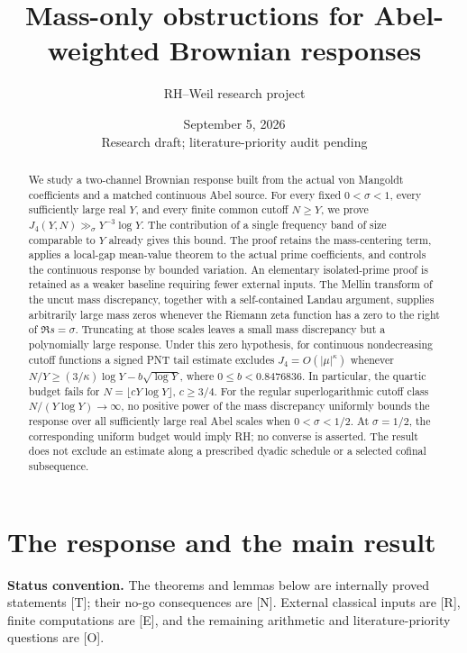 \documentclass[11pt,a4paper]{article}
\title{Mass-only obstructions for Abel-weighted Brownian responses}
\author{RH--Weil research project}
\date{September 5, 2026\\[3pt]\small Research draft; literature-priority audit pending}
\theoremstyle{definition}
\theoremstyle{remark}
\begin{document}
\maketitle
\begin{abstract}
We study a two-channel Brownian response built from the actual
von Mangoldt coefficients and a matched continuous Abel source.
For every fixed \(0<\sigma<1\), every sufficiently large real \(Y\),
and every finite common cutoff \(N\ge Y\), we prove
\(J_4(Y,N)\gg_\sigma Y^{-3}\log Y\).
The contribution of a single frequency band of size comparable to
\(Y\) already gives this bound. The proof retains the mass-centering
term, applies a local-gap mean-value theorem to the actual prime
coefficients, and controls the continuous response by bounded variation.
An elementary isolated-prime proof is retained as a weaker baseline
requiring fewer external inputs.
The Mellin transform of the uncut mass discrepancy, together with
a self-contained Landau argument, supplies arbitrarily large mass
zeros whenever the Riemann zeta function has a zero to the right
of \(\Re s=\sigma\). Truncating at those scales leaves a
small mass discrepancy but a polynomially large response.
Under this zero hypothesis, for continuous nondecreasing cutoff
functions a signed PNT tail
estimate excludes \(J_4=O(|\mu|^\kappa)\) whenever
\(N/Y\ge(3/\kappa)\log Y-b\sqrt{\log Y}\), where
\(0\le b<0.8476836\). In particular, the quartic budget fails for
\(N=\lfloor cY\log Y\rfloor\), \(c\ge3/4\).
For the regular superlogarithmic cutoff class
\(N/(Y\log Y)\to\infty\), no positive power of the mass discrepancy
uniformly bounds the response over all sufficiently large real
Abel scales when \(0<\sigma<1/2\). At \(\sigma=1/2\), the corresponding
uniform budget would imply RH; no converse is asserted.
The result does not exclude an estimate along a prescribed dyadic
schedule or a selected cofinal subsequence.
\end{abstract}

\section{The response and the main result}

\noindent\textbf{Status convention.}
The theorems and lemmas below are internally proved statements [T];
their no-go consequences are [N]. External classical inputs are [R],
finite computations are [E], and the remaining arithmetic and
literature-priority questions are [O].
\end{document}

